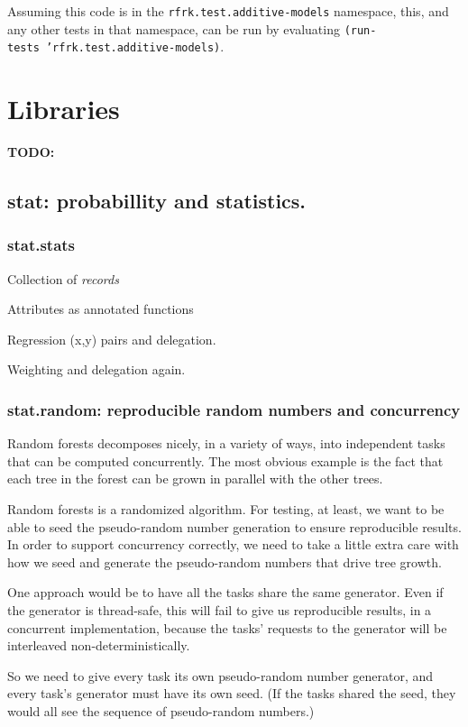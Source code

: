 \documentclass[10pt,openany]{article}
\numberwithin{definition}{section}
\numberwithin{example}{section}
\numberwithin{equation}{section}
\numberwithin{figure}{section}
\begin{document}
Assuming this code is in the \texttt{rfrk.test.additive-models} namespace,
this, and any other tests in that namespace, can be run by evaluating
\texttt{(run-tests~'rfrk.test.additive-models)}.

\newpage{}


\section{\label{sec:Libraries}Libraries}

\textbf{TODO:}


\subsection{stat: probabillity and statistics.}


\subsubsection{stat.stats}

Collection of \emph{records}

Attributes as annotated functions

Regression (x,y) pairs and delegation.

Weighting and delegation again.


\subsubsection{stat.random: reproducible random numbers and concurrency}

Random forests decomposes nicely, in a variety of ways, into independent
tasks that can be computed concurrently. The most obvious example
is the fact that each tree in the forest can be grown in parallel
with the other trees.

Random forests is a randomized algorithm. For testing, at least, we
want to be able to seed the pseudo-random number generation to ensure
reproducible results. In order to support concurrency correctly, we
need to take a little extra care with how we seed and generate the
pseudo-random numbers that drive tree growth.

One approach would be to have all the tasks share the same generator.
Even if the generator is thread-safe, this will fail to give us reproducible
results, in a concurrent implementation, because the tasks' requests
to the generator will be interleaved non-deterministically.

So we need to give every task its own pseudo-random number generator,
and every task's generator must have its own seed. (If the tasks shared
the seed, they would all see the sequence of pseudo-random numbers.)
\end{document}
